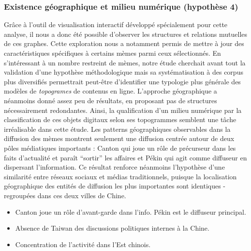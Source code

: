 \subsubsection{Existence g\'eographique et milieu num\'erique (hypoth\`ese 4)}
 
Gr\^ace \`a l{\textquoteright}outil de visualisation interactif d\'evelopp\'e sp\'ecialement pour cette analyse, il nous a donc \'et\'e possible d{\textquoteright}observer les structures et relations mutuelles de ces graphes. Cette exploration nous a notamment permis de mettre \`a jour des caract\'eristiques sp\'ecifiques \`a certains m\`emes parmi ceux s\'electionn\'es. En s{\textquoteright}int\'eressant \`a un nombre restreint de m\`emes, notre \'etude cherchait avant tout la validation d{\textquoteright}une hypoth\`ese m\'ethodologique mais sa syst\'ematisation \`a des corpus plus diversifi\'es permettrait peut-\^etre d{\textquoteright}identifier une typologie plus g\'en\'erale des mod\`eles de \textit{topogrames} de contenus en ligne. L{\textquoteright}approche g\'eographique a n\'eanmoins donn\'e assez peu de r\'esultats, en proposant pas de structures n\'ecessairement redondantes. Ainsi, la qualification d{\textquoteright}un milieu num\'erique par la classification de ces objets digitaux selon ses topogrammes semblent une t\^ache irr\'ealisable dans cette \'etude. Les patterns g\'eographiques observables dans la diffusion des m\`emes montrent seulement une diffusion centr\'ee autour de deux p\^oles m\'ediatiques importants : Canton qui joue un r\^ole de pr\'ecurseur dans les faits d{\textquoteright}actualit\'e et para\^it {\textquotedblleft}sortir{\textquotedblright} les affaires et P\'ekin qui agit comme diffuseur en dispersant l{\textquoteright}information. Ce r\'esultat renforce n\'eanmoins l{\textquoteright}hypoth\`ese d{\textquoteright}une similarit\'e entre r\'eseaux sociaux et m\'edias traditionnels, puisque la localisation g\'eographique des entit\'es de diffusion les plus importantes sont identiques - regroup\'ees dans ces deux villes de Chine.

\begin{itemize}
    \item Canton joue un rôle d'avant-garde dans l'info. Pékin est le diffuseur principal.
    \item Absence de Taiwan des discussions politiques internes à la Chine.
    \item Concentration de l'activité dans l'Est chinois.
\end{itemize}

